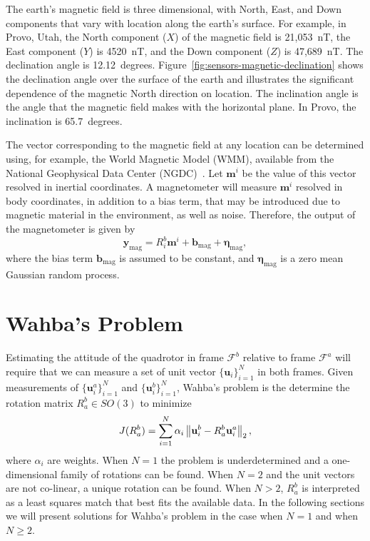 The earth's magnetic field is three dimensional, with North, East, and Down components that vary with location along the earth's surface. For example, in Provo, Utah, the North component ($X$) of the magnetic field is 21,053~nT, the East component ($Y$) is 4520~nT, and the Down component ($Z$) is 47,689~nT. The declination angle is 12.12~degrees. Figure~\ref{fig:sensors-magnetic-declination} shows the declination angle over the surface of the earth and illustrates the significant dependence of the magnetic North direction on location. The inclination angle is the angle that the magnetic field makes with the horizontal plane. In Provo, the inclination is 65.7~degrees.


The vector corresponding to the magnetic field at any location can be determined using, for example, the World Magnetic Model (WMM), available from the National Geophysical Data Center (NGDC)~\cite{WMM2010}.  Let $\mathbf{m}^i$ be the value of this vector resolved in inertial coordinates.  A magnetometer will measure $\mathbf{m}^i$ resolved in body coordinates, in addition to a bias term, that may be introduced due to magnetic material in the environment, as well as noise.  Therefore, the output of the magnetometer is given by
\begin{equation}\label{eq:magnetometer_measurement}
\mathbf{y}_{\text{mag}} = R_i^b \mathbf{m}^i + \mathbf{b}_{\text{mag}} + \boldsymbol{\eta}_{\text{mag}},
\end{equation}
where the bias term $\mathbf{b}_{\text{mag}}$ is assumed to be constant, and $\boldsymbol{\eta}_{\text{mag}}$ is a zero mean Gaussian random process.


\section{Wahba's Problem}

Estimating the attitude of the quadrotor in frame $\mathcal{F}^b$ relative to frame $\mathcal{F}^a$ will require that we can measure a set of unit vector $\{\mathbf{u}_i\}_{i=1}^N$ in both frames.  Given measurements of $\{\mathbf{u}_i^a\}_{i=1}^N$ and $\{\mathbf{u}_i^b\}_{i=1}^N$, Wahba's problem is the determine the rotation matrix $R_a^b\in SO(3)$ to minimize
\[
J(R_a^b) = \sum_{i=1}^N \alpha_i\left\|\mathbf{u}_i^b - R_a^b\mathbf{u}_i^a\right\|_2,
\]
where $\alpha_i$ are weights.  
When $N=1$ the problem is underdetermined and a one-dimensional family of rotations can be found.  When $N=2$ and the unit vectors are not co-linear, a unique rotation can be found.  When $N>2$, $R_a^b$ is interpreted as a least squares match that best fits the available data.  
In the following sections we will present solutions for Wahba's problem in the case when $N=1$ and when $N\geq 2$.

